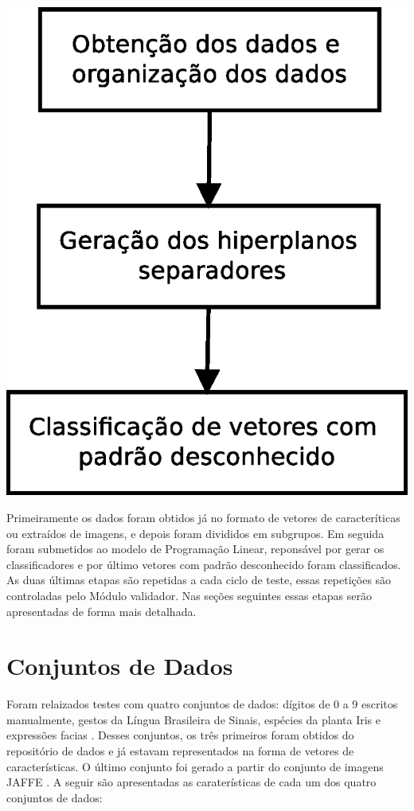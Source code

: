 \begin{center}
	\includegraphics[scale=0.5]{graficos/diagrama_modulos}
	\label{img:diagrama_modulos}
\end{center}

Primeiramente os dados foram obtidos já no formato de vetores de caracteríticas ou extraídos de imagens, e depois foram divididos em subgrupos. Em seguida foram submetidos ao modelo de Programação Linear, reponsável por gerar os classificadores e por último vetores com padrão desconhecido foram classificados. As duas últimas etapas são repetidas a cada ciclo de teste, essas repetições são controladas pelo Módulo validador. Nas seções seguintes essas etapas serão apresentadas de forma mais detalhada.

\section{Conjuntos de Dados}
Foram relaizados testes com quatro conjuntos de dados: dígitos de 0 a 9 escritos manualmente, gestos da Língua Brasileira de Sinais, espécies da planta Iris e expressões facias . Desses conjuntos, os três primeiros foram obtidos do repositório de dados  e já estavam representados na forma de vetores de características. O último conjunto foi gerado a partir do conjunto de imagens JAFFE \cite{Jaffe}. A seguir são apresentadas as caraterísticas de cada um dos quatro conjuntos de dados:

